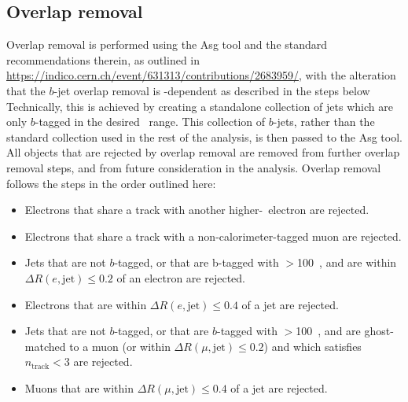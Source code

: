\subsection{Overlap removal}
\label{sec:overlapRemoval}
Overlap removal is performed using the Asg tool and the standard recommendations therein,
as outlined in \href{https://indico.cern.ch/event/631313/contributions/2683959/}{https://indico.cern.ch/event/631313/contributions/2683959/}, with the alteration that the $b$-jet overlap removal is \pT-dependent as described in the steps below
Technically, this is achieved by creating a standalone collection of jets which are only $b$-tagged in the desired \pT\ range.
This collection of $b$-jets, rather than the standard collection used in the rest of the analysis, is then passed to the Asg tool.
All objects that are rejected by overlap removal are removed from further overlap removal steps, and from future consideration in the analysis.
Overlap removal follows the steps in the order outlined here:
\begin{itemize}
  \item{Electrons that share a track with another higher-\pT\ electron are rejected.}
  \item{Electrons that share a track with a non-calorimeter-tagged muon are rejected.}
  \item{Jets that are not $b$-tagged, or that are b-tagged with \pT$>$100~\GeV, and are within \(\Delta R(e,\mathrm{jet})\leq0.2\) of an electron are rejected.}
  \item{Electrons that are within \(\Delta R(e,\mathrm{jet})\leq0.4\) of a jet are rejected.}
  \item{Jets that are not $b$-tagged, or that are $b$-tagged with \pT$>$100~\GeV, and are ghost-matched to a muon (or within \(\Delta R(\mu,\mathrm{jet})\leq0.2\)) and which satisfies \(n_{\mathrm{track}}<3\) are rejected.}
  \item{Muons that are within \(\Delta R(\mu,\mathrm{jet})\leq0.4\) of a jet are rejected.}
\end{itemize}
